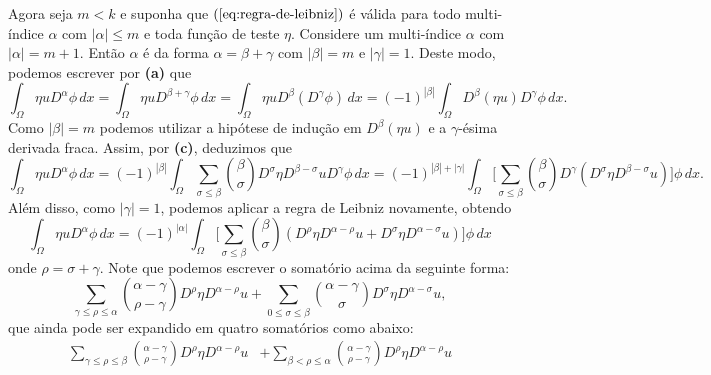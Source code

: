 \documentclass[a4paper, 11pt]{book}
\theoremstyle{definition}
\begin{document}
\begin{prf}
    Agora seja $m < k$ e suponha que $(\ref{eq:regra-de-leibniz})$ é válida para todo multi-índice $\alpha$ com $|\alpha| \leqslant m$ e toda função de teste $\eta$.
    Considere um multi-índice $\alpha$ com $|\alpha| = m + 1$.
    Então $\alpha$ é da forma $\alpha = \beta + \gamma$ com $|\beta| = m$ e $|\gamma| = 1$. 
    Deste modo, podemos escrever por \textbf{(a)} que
    \[
        \int_\Omega \eta u D^{\alpha}\phi \, dx = \int_\Omega \eta u D^{\beta + \gamma}\phi \, dx = \int_\Omega \eta u D^\beta(D^\gamma \phi) \, dx = (-1)^{|\beta|} \int_\Omega D^{\beta} (\eta u) D^{\gamma}\phi \,dx.
    \]
    Como $|\beta| = m$ podemos utilizar a hipótese de indução em $D^{\beta}(\eta u)$ e a $\gamma$-ésima derivada fraca. Assim, por \textbf{(c)}, deduzimos que
    {\small
    \[
        \int_\Omega \eta u D^{\alpha}\phi \, dx = (-1)^{|\beta|} \int_\Omega \sum_{\sigma \leqslant \beta} \binom{\beta}{\sigma} D^{\sigma} \eta D^{\beta - \sigma} u D^{\gamma}\phi \, dx = (-1)^{|\beta| + |\gamma|} \int_\Omega \bigg[\sum_{\sigma \leqslant \beta} \binom{\beta}{\sigma} D^{\gamma}(D^{\sigma} \eta D^{\beta - \sigma} u)\bigg] \phi \, dx.
    \]}\!
    Além disso, como $|\gamma| = 1$, podemos aplicar a regra de Leibniz novamente, obtendo
    \begin{equation} \label{eq:integral-etau}
        \int_\Omega \eta u D^{\alpha}\phi \, dx = (-1)^{|\alpha|} \int_\Omega \bigg[\sum_{\sigma \leqslant \beta} \binom{\beta}{\sigma} \left(D^{\rho}\eta D^{\alpha - \rho} u + D^{\sigma} \eta D^{\alpha - \sigma} u\right)\bigg] \phi \,dx
    \end{equation}
    onde $\rho = \sigma + \gamma$. 
    Note que podemos escrever o somatório acima da seguinte forma:
    \begin{equation*} \label{eq:somatorio}
        \sum_{\gamma \leqslant \rho \leqslant \alpha} \binom{\alpha - \gamma}{\rho - \gamma} D^{\rho}\eta D^{\alpha - \rho} u + \sum_{0 \leqslant\sigma \leqslant \beta} \binom{\alpha - \gamma}{\sigma} D^{\sigma} \eta D^{\alpha - \sigma} u,
    \end{equation*}
    que ainda pode ser expandido em quatro somatórios como abaixo:
    \begin{equation} \label{eq:somatorio-2}
        \begin{aligned}
            \sum_{\gamma \leqslant \rho \leqslant \beta} \binom{\alpha - \gamma}{\rho - \gamma} D^{\rho}\eta D^{\alpha - \rho} u &+ \sum_{\beta < \rho \leqslant \alpha} \binom{\alpha - \gamma}{\rho - \gamma} D^{\rho}\eta D^{\alpha - \rho} u \\

\end{aligned}
\end{equation}
\end{prf}
\end{document}
